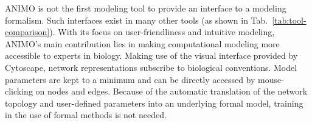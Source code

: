 \documentclass{bmcart}
\begin{document}
ANIMO is not the first modeling tool to provide an interface to a
modeling formalism. Such interfaces exist in many other tools (as shown in Tab.~\ref{tab:tool-comparison}). With its
focus on user-friendliness and intuitive modeling, ANIMO's main contribution lies
in making computational modeling more accessible to experts in biology.
Making use of the visual
interface provided by Cytoscape, network representations subscribe to biological conventions.
Model parameters are kept to a minimum and can be directly accessed by mouse-clicking on
nodes and edges. Because of the automatic translation of the network topology and
user-defined parameters into an underlying formal model, training in the use of formal methods
is not needed.


%
\end{document}
